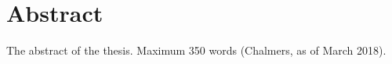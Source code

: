 \thispagestyle{empty}
\section*{Abstract}
The abstract of the thesis.
%
Maximum 350 words (Chalmers, as of March 2018).
\vspace{5 mm} 

\vspace{3 mm} 

\newpage
\thispagestyle{empty}
